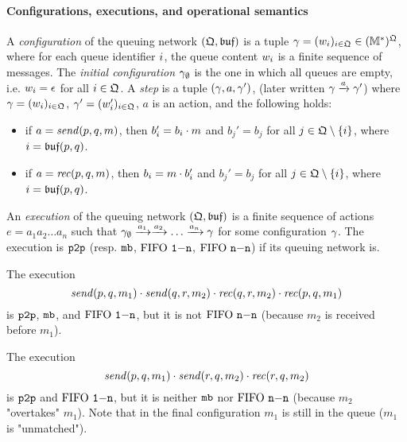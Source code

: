 \paragraph{\bf Configurations, executions, and operational semantics}
A \emph{configuration} of the queuing network $(\mathfrak{Q},\mathfrak{buf})$ is
a tuple $\gamma=(w_{i})_{i\in\mathfrak{Q}}\in (\mathbb{M}^*)^{\mathfrak{Q}}$,
where for each queue identifier $i$, the queue content $w_{i}$ is a finite sequence of messages.
The \emph{initial configuration} $\gamma_{\emptyset}$ is the one in which all queues are empty, i.e.
$w_{i}=\epsilon$ for all $i\in\mathfrak{Q}$.
A \emph{step} is a tuple $(\gamma,a,\gamma')$, (later written $\gamma\xrightarrow{a}\gamma'$)
where $\gamma=(w_{i})_{i\in\mathfrak{Q}}$,
$\gamma'=(w_{i}')_{i\in\mathfrak{Q}}$,
$a$ is an action, and the following holds:
\begin{itemize}
  \item if $a=\mathit{send}(p, q, m)$, then $b'_{i}=b_{i}\cdot m$
  and $b_j'=b_j$ for all $j\in \mathfrak{Q}\setminus\{i\}$,
  where $i=\mathfrak{buf}(p,q)$.
  \item if $a=\mathit{rec}(p, q, m)$, then $b_{i}=m\cdot b'_{i}$
  and $b_j'=b_j$ for all $j\in \mathfrak{Q}\setminus\{i\}$,
  where $i=\mathfrak{buf}(p,q)$.
\end{itemize}
An \emph{execution} of the queuing network $(\mathfrak{Q},\mathfrak{buf})$
is a finite sequence of actions $e=a_1a_2\ldots a_n$ such that
$\gamma_{\emptyset}\xrightarrow{a_1}\xrightarrow{a_2}\ldots\xrightarrow{a_n}\gamma$ for some configuration $\gamma$.
The execution is $\mathtt{p2p}$ (resp. $\mathtt{mb}$, $\text{FIFO } \mathtt{1\mathsf{-}n}$, $\text{FIFO } \mathtt{n\mathsf{-}n}$) if its queuing network is.

\begin{example}
The execution
$$
\mathit{send}(p, q, m_1)\cdot\mathit{send}(q, r, m_2)\cdot\mathit{rec}(q, r, m_2)\cdot\mathit{rec}(p, q, m_1)
$$
is $\mathtt{p2p}$, $\mathtt{mb}$, and $\text{FIFO } \mathtt{1\mathsf{-}n}$, but it is not $\text{FIFO } \mathtt{n\mathsf{-}n}$ (because $m_2$ is received before $m_1$).
\end{example}

\begin{example}
    The execution
    $$
    \mathit{send}(p, q, m_1)\cdot\mathit{send}(r, q, m_2)\cdot\mathit{rec}(r, q, m_2)
    $$
    is $\mathtt{p2p}$ and $\text{FIFO } \mathtt{1\mathsf{-}n}$, but it is neither $\mathtt{mb}$ nor $\text{FIFO } \mathtt{n\mathsf{-}n}$ (because $m_2$ "overtakes" $m_1$). Note that in the
    final configuration $m_1$ is still in the queue ($m_1$ is "unmatched").
\end{example}


